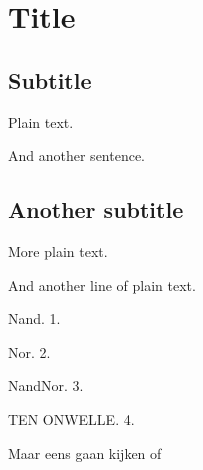 \documentclass{article}
\begin{document}
\section{Title}



\subsection{Subtitle}

Plain text.

And another sentence.

\subsection{Another subtitle}

More plain text.

And another line of plain text.

Nand. 1.

Nor. 2.

NandNor. 3.

TEN ONWELLE. 4.

Maar eens gaan kijken of
\end{document}
